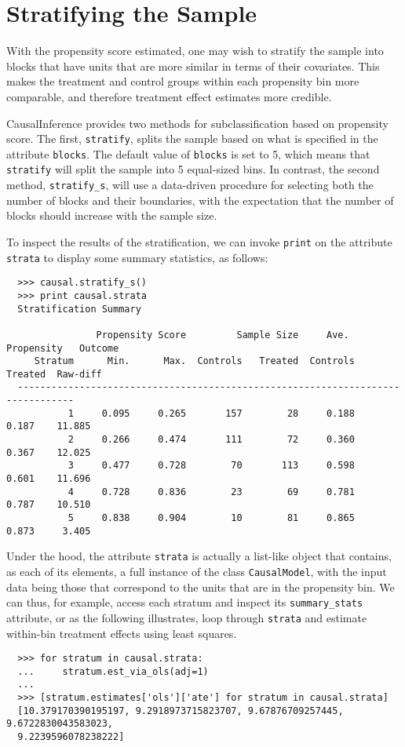 \documentclass[12pt]{article}
\theoremstyle{definition}
\theoremstyle{definition}
\theoremstyle{definition}
\theoremstyle{remark}
\begin{document}
\section{Stratifying the Sample} \label{sec.e}

With the propensity score estimated, one may wish to stratify the sample into blocks that have units that are more similar in terms of their covariates. This makes the treatment and control groups within each propensity bin more comparable, and therefore treatment effect estimates more credible.

CausalInference provides two methods for subclassification based on propensity score. The first, \texttt{stratify}, splits the sample based on what is specified in the attribute \texttt{blocks}. The default value of \texttt{blocks} is set to 5, which means that \texttt{stratify} will split the sample into 5 equal-sized bins. In contrast, the second method, \texttt{stratify\_s}, will use a data-driven procedure for selecting both the number of blocks and their boundaries, with the expectation that the number of blocks should increase with the sample size.

To inspect the results of the stratification, we can invoke \texttt{print} on the attribute \texttt{strata} to display some summary statistics, as follows:
\begin{verbatim}
  >>> causal.stratify_s()
  >>> print causal.strata
  Stratification Summary
  
                Propensity Score         Sample Size     Ave. Propensity   Outcome
     Stratum      Min.      Max.  Controls   Treated  Controls   Treated  Raw-diff
  --------------------------------------------------------------------------------
           1     0.095     0.265       157        28     0.188     0.187    11.885
           2     0.266     0.474       111        72     0.360     0.367    12.025
           3     0.477     0.728        70       113     0.598     0.601    11.696
           4     0.728     0.836        23        69     0.781     0.787    10.510
           5     0.838     0.904        10        81     0.865     0.873     3.405
\end{verbatim}

Under the hood, the attribute \texttt{strata} is actually a list-like object that contains, as each of its elements, a full instance of the class \texttt{CausalModel}, with the input data being those that correspond to the units that are in the propensity bin. We can thus, for example, access each stratum and inspect its \texttt{summary\_stats} attribute, or as the following illustrates, loop through \texttt{strata} and estimate within-bin treatment effects using least squares.
\begin{verbatim}
  >>> for stratum in causal.strata:
  ...     stratum.est_via_ols(adj=1)
  ... 
  >>> [stratum.estimates['ols']['ate'] for stratum in causal.strata]
  [10.379170390195197, 9.2918973715823707, 9.67876709257445, 9.6722830043583023,
  9.2239596078238222]
\end{verbatim}
\end{document}
